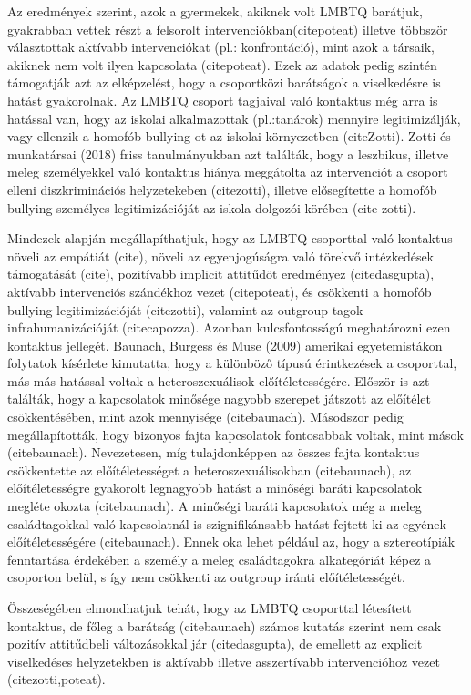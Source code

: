 Az eredmények szerint, azok a gyermekek, akiknek volt LMBTQ barátjuk, gyakrabban vettek részt a felsorolt intervenciókban(citepoteat) illetve többször választottak aktívabb intervenciókat (pl.: konfrontáció), mint azok a társaik, akiknek nem volt ilyen kapcsolata (citepoteat). 
Ezek az adatok pedig szintén támogatják azt az elképzelést, hogy a csoportközi barátságok a viselkedésre is hatást gyakorolnak. Az LMBTQ csoport tagjaival való kontaktus még arra is hatással van, hogy az iskolai alkalmazottak (pl.:tanárok) mennyire legitimizálják, vagy ellenzik a homofób bullying-ot az iskolai környezetben (citeZotti). Zotti és munkatársai (2018) friss tanulmányukban azt találták, hogy a leszbikus, illetve meleg személyekkel való kontaktus hiánya meggátolta az intervenciót a csoport elleni diszkriminációs helyzetekeben (citezotti), illetve elősegítette a  homofób bullying személyes legitimizációját az iskola dolgozói körében (cite zotti).
\\
\par
Mindezek alapján megállapíthatjuk, hogy az LMBTQ csoporttal való kontaktus növeli az empátiát (cite), növeli az egyenjogúságra való törekvő intézkedések támogatását (cite), pozitívabb implicit attitűdöt eredményez (citedasgupta), aktívabb intervenciós szándékhoz vezet (citepoteat), és csökkenti a homofób bullying legitimizációját (citezotti), valamint az outgroup  tagok infrahumanizációját (citecapozza). Azonban kulcsfontosságú meghatározni ezen kontaktus jellegét. Baunach, Burgess és Muse (2009) amerikai egyetemistákon folytatok kísérlete kimutatta, hogy a különböző típusú érintkezések a csoporttal, más-más hatással voltak a heteroszexuálisok előítéletességére. Először is azt találták, hogy a kapcsolatok minősége nagyobb szerepet játszott az előítélet csökkentésében, mint azok mennyisége (citebaunach). Másodszor pedig megállapították, hogy bizonyos fajta kapcsolatok fontosabbak voltak, mint mások (citebaunach). Nevezetesen, míg tulajdonképpen az összes fajta kontaktus csökkentette az előítéletességet a heteroszexuálisokban (citebaunach), az előítéletességre gyakorolt legnagyobb hatást a minőségi baráti kapcsolatok megléte okozta (citebaunach). A minőségi baráti kapcsolatok még a meleg családtagokkal való kapcsolatnál is szignifikánsabb hatást fejtett ki az egyének előítéletességére (citebaunach). Ennek oka lehet például az, hogy a sztereotípiák fenntartása érdekében a személy a meleg családtagokra alkategóriát képez a csoporton belül, s így nem csökkenti az outgroup iránti előítéletességét.
\\
\par
Összeségében elmondhatjuk tehát, hogy az LMBTQ csoporttal létesített kontaktus, de főleg a barátság (citebaunach) számos kutatás szerint nem csak pozitív attitűdbeli változásokkal jár (citedasgupta), de emellett az explicit viselkedéses helyzetekben is aktívabb illetve asszertívabb intervencióhoz vezet (citezotti,poteat).

